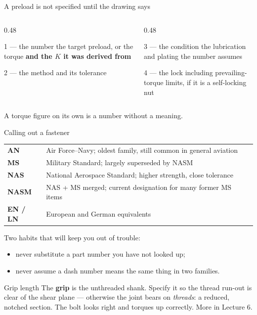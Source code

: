 \documentclass[aspectratio=169,10pt]{beamer}
\begin{document}
\begin{frame}{A preload is not specified until the drawing says}
\begin{columns}[T]
\begin{column}{0.48\textwidth}
\begin{block}{1 --- the number}
the target preload, or the torque \textbf{and the $K$ it was derived from}
\end{block}
\begin{block}{2 --- the method}
and its tolerance
\end{block}
\end{column}
\begin{column}{0.48\textwidth}
\begin{block}{3 --- the condition}
the lubrication and plating the number assumes
\end{block}
\begin{block}{4 --- the lock}
including prevailing-torque limits, if it is a self-locking nut
\end{block}
\end{column}
\end{columns}
\vfill
\centering
\large A torque figure on its own is a number without a meaning.
\end{frame}

\begin{frame}{Calling out a fastener}
\centering\small
\begin{tabular}{@{}ll@{}}
\toprule
\textbf{AN} & Air Force--Navy; oldest family, still common in general aviation\\
\textbf{MS} & Military Standard; largely superseded by NASM\\
\textbf{NAS} & National Aerospace Standard; higher strength, close tolerance\\
\textbf{NASM} & NAS + MS merged; current designation for many former MS items\\
\textbf{EN / LN} & European and German equivalents\\
\bottomrule
\end{tabular}
\vfill
\raggedright
Two habits that will keep you out of trouble:
\begin{itemize}
  \item never substitute a part number you have not looked up;
  \item never assume a dash number means the same thing in two families.
\end{itemize}
\vfill
\begin{alertblock}{Grip length}
The \textbf{grip} is the unthreaded shank. Specify it so the thread run-out is clear of the shear
plane --- otherwise the joint bears on \emph{threads}: a reduced, notched section. The bolt looks
right and torques up correctly. More in Lecture 6.
\end{alertblock}
\end{frame}
\end{document}
